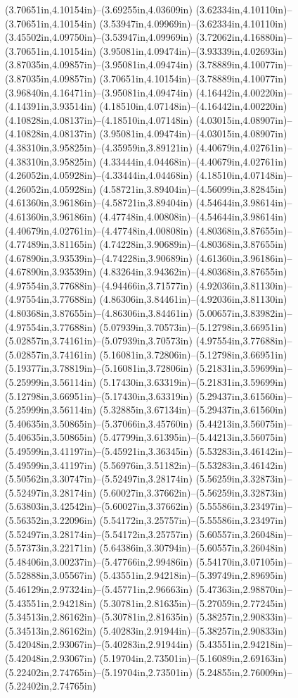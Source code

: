 (3.70651in,4.10154in)--(3.69255in,4.03609in) (3.62334in,4.10110in)--(3.70651in,4.10154in) (3.53947in,4.09969in)--(3.62334in,4.10110in) (3.45502in,4.09750in)--(3.53947in,4.09969in) (3.72062in,4.16880in)--(3.70651in,4.10154in) (3.95081in,4.09474in)--(3.93339in,4.02693in) (3.87035in,4.09857in)--(3.95081in,4.09474in) (3.78889in,4.10077in)--(3.87035in,4.09857in) (3.70651in,4.10154in)--(3.78889in,4.10077in) (3.96840in,4.16471in)--(3.95081in,4.09474in) (4.16442in,4.00220in)--(4.14391in,3.93514in) (4.18510in,4.07148in)--(4.16442in,4.00220in) (4.10828in,4.08137in)--(4.18510in,4.07148in) (4.03015in,4.08907in)--(4.10828in,4.08137in) (3.95081in,4.09474in)--(4.03015in,4.08907in) (4.38310in,3.95825in)--(4.35959in,3.89121in) (4.40679in,4.02761in)--(4.38310in,3.95825in) (4.33444in,4.04468in)--(4.40679in,4.02761in) (4.26052in,4.05928in)--(4.33444in,4.04468in) (4.18510in,4.07148in)--(4.26052in,4.05928in) (4.58721in,3.89404in)--(4.56099in,3.82845in) (4.61360in,3.96186in)--(4.58721in,3.89404in) (4.54644in,3.98614in)--(4.61360in,3.96186in) (4.47748in,4.00808in)--(4.54644in,3.98614in) (4.40679in,4.02761in)--(4.47748in,4.00808in) (4.80368in,3.87655in)--(4.77489in,3.81165in) (4.74228in,3.90689in)--(4.80368in,3.87655in) (4.67890in,3.93539in)--(4.74228in,3.90689in) (4.61360in,3.96186in)--(4.67890in,3.93539in) (4.83264in,3.94362in)--(4.80368in,3.87655in) (4.97554in,3.77688in)--(4.94466in,3.71577in) (4.92036in,3.81130in)--(4.97554in,3.77688in) (4.86306in,3.84461in)--(4.92036in,3.81130in) (4.80368in,3.87655in)--(4.86306in,3.84461in) (5.00657in,3.83982in)--(4.97554in,3.77688in) (5.07939in,3.70573in)--(5.12798in,3.66951in) (5.02857in,3.74161in)--(5.07939in,3.70573in) (4.97554in,3.77688in)--(5.02857in,3.74161in) (5.16081in,3.72806in)--(5.12798in,3.66951in) (5.19377in,3.78819in)--(5.16081in,3.72806in) (5.21831in,3.59699in)--(5.25999in,3.56114in) (5.17430in,3.63319in)--(5.21831in,3.59699in) (5.12798in,3.66951in)--(5.17430in,3.63319in) (5.29437in,3.61560in)--(5.25999in,3.56114in) (5.32885in,3.67134in)--(5.29437in,3.61560in) (5.40635in,3.50865in)--(5.37066in,3.45760in) (5.44213in,3.56075in)--(5.40635in,3.50865in) (5.47799in,3.61395in)--(5.44213in,3.56075in) (5.49599in,3.41197in)--(5.45921in,3.36345in) (5.53283in,3.46142in)--(5.49599in,3.41197in) (5.56976in,3.51182in)--(5.53283in,3.46142in) (5.50562in,3.30747in)--(5.52497in,3.28174in) (5.56259in,3.32873in)--(5.52497in,3.28174in) (5.60027in,3.37662in)--(5.56259in,3.32873in) (5.63803in,3.42542in)--(5.60027in,3.37662in) (5.55586in,3.23497in)--(5.56352in,3.22096in) (5.54172in,3.25757in)--(5.55586in,3.23497in) (5.52497in,3.28174in)--(5.54172in,3.25757in) (5.60557in,3.26048in)--(5.57373in,3.22171in) (5.64386in,3.30794in)--(5.60557in,3.26048in) (5.48406in,3.00237in)--(5.47766in,2.99486in) (5.54170in,3.07105in)--(5.52888in,3.05567in) (5.43551in,2.94218in)--(5.39749in,2.89695in) (5.46129in,2.97324in)--(5.45771in,2.96663in) (5.47363in,2.98870in)--(5.43551in,2.94218in) (5.30781in,2.81635in)--(5.27059in,2.77245in) (5.34513in,2.86162in)--(5.30781in,2.81635in) (5.38257in,2.90833in)--(5.34513in,2.86162in) (5.40283in,2.91944in)--(5.38257in,2.90833in) (5.42048in,2.93067in)--(5.40283in,2.91944in) (5.43551in,2.94218in)--(5.42048in,2.93067in) (5.19704in,2.73501in)--(5.16089in,2.69163in) (5.22402in,2.74765in)--(5.19704in,2.73501in) (5.24855in,2.76009in)--(5.22402in,2.74765in) 